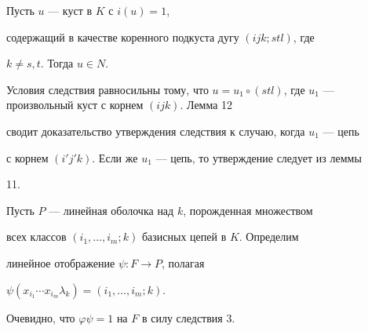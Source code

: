\begin{cor} Пусть $u$ --- куст в $K$ с $i(u)=1$,


содержащий в качестве коренного подкуста дугу $(ijk;stl)$, где


$k\ne s,t$. Тогда $u\in N$.


\end{cor}





\begin{pf} Условия следствия равносильны тому, что $u=


u_1\circ (stl)$, где $u_1$ --- произвольный куст с корнем $(ijk)$. Лемма 12


сводит доказательство утверждения следствия к случаю, когда $u_1$ --- цепь


с корнем $(i'j'k)$. Если же $u_1$ --- цепь, то утверждение следует из леммы


11.


\end{pf}





Пусть $P$ --- линейная оболочка над $k$, порожденная множеством


всех классов $(i_1,\dotsc ,i_m;k)$ базисных цепей в $K$. Определим


линейное отображение $\psi :F \rightarrow P$, полагая


$\psi (x_{i_1}\dotsb x_{i_m}\lambda _k)=(i_1,\dotsc ,i_m;k)$.


Очевидно, что $\varphi \psi =1$ на $F$ в силу следствия 3.





